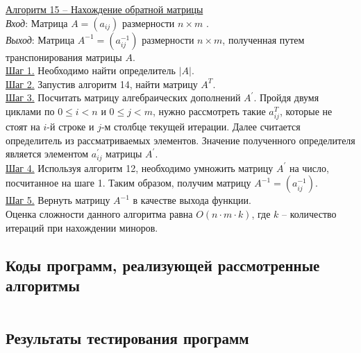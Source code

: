 \documentclass[bachelor, och, labwork]{shiza}
\begin{document}
        \underline{Алгоритм 15 -- Нахождение обратной матрицы}\\
            \textit{Вход}: Матрица $A = (a_{ij})$ размерности $n \times m$ .\\
            \textit{Выход}: Матрица $A^{-1} = (a^{-1}_{ij})$ размерности $n \times m$, полученная путем транспонирования матрицы $A$.\\
            \underline{Шаг 1.} Необходимо найти определитель $|A|$.\\
            \underline{Шаг 2.} Запустив алгоритм 14, найти матрицу $A^T$.\\
            \underline{Шаг 3.} Посчитать матрицу алгебраических дополнений $A^{'}$. Пройдя двумя циклами по $0 \leq i < n$ и $0 \leq j < m$, нужно
            рассмотреть такие $a^T_{ij}$, которые не стоят на $i$-й строке и $j$-м столбце текущей итерации. Далее считается определитель из рассматриваемых
            элементов. Значение полученного определителя является элементом $a^{'}_{ij}$ матрицы $A^{'}$.\\
            \underline{Шаг 4.} Используя алгоритм 12, необходимо умножить матрицу $A^{'}$ на число, посчитанное на шаге 1. Таким образом, получим матрицу
            $A^{-1} = (a^{-1}_{ij})$.\\
            \underline{Шаг 5.} Вернуть матрицу $A^{-1}$ в качестве выхода функции.\\
            Оценка сложности данного алгоритма равна $O(n \cdot m \cdot k)$, где $k$ -- количество итераций при нахождении миноров.\\


        \subsection{Коды программ, реализующей рассмотренные алгоритмы}


        \inputminted[fontsize=\small]{Python}{code/aua-lab3.py}








    \subsection{Результаты тестирования программ}
        
\end{document}
